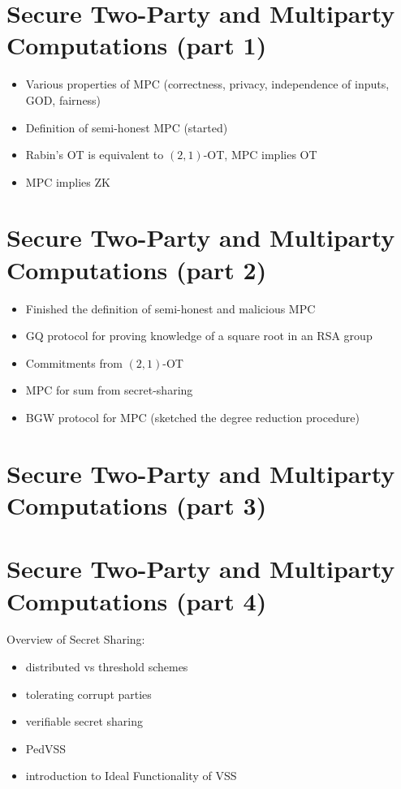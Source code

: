 \documentclass{llncs}
\begin{document}
\section{Secure Two-Party and Multiparty Computations (part 1)}
\begin{itemize}
	\item Various properties of MPC (correctness, privacy, independence of inputs, GOD, fairness) \cite{LindellMPC}
	\item Definition of semi-honest MPC (started)
	\item Rabin's OT is equivalent to $(2,1)$-OT, MPC implies OT
	\item MPC implies ZK
\end{itemize}

\section{Secure Two-Party and Multiparty Computations (part 2)}
\begin{itemize}
	\item Finished the definition of semi-honest and malicious MPC
	\item GQ protocol for proving knowledge of a square root in an RSA group \cite[Section 19.5.5]{Cryptobook}
	\item Commitments from $(2,1)$-OT
	\item MPC for sum from secret-sharing
	\item BGW protocol for MPC (sketched the degree reduction procedure)
\end{itemize}


\section{Secure Two-Party and Multiparty Computations (part 3)}

\section{Secure Two-Party and Multiparty Computations (part 4)}
Overview of Secret Sharing:
\begin{itemize}
	\item distributed vs threshold schemes
	\item tolerating corrupt parties
	\item verifiable secret sharing
	\item PedVSS
	\item introduction to Ideal Functionality of VSS
\end{itemize}
\end{document}
